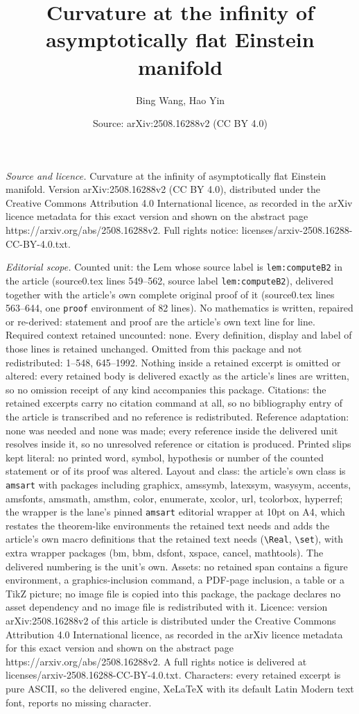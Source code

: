 \documentclass[10pt,a4paper]{amsart}
\title[Curvature at the infinity of asymptotically flat Einstein ma]{Curvature at the infinity of asymptotically flat Einstein manifold}
\author{Bing Wang, Hao Yin}
\date{Source: arXiv:2508.16288v2 (CC BY 4.0)}
\begin{document}
\maketitle

\noindent\emph{Source and licence.} Curvature at the infinity of asymptotically flat Einstein manifold. Version arXiv:2508.16288v2 (CC BY 4.0), distributed under the Creative Commons Attribution 4.0 International licence, as recorded in the arXiv licence metadata for this exact version and shown on the abstract page https://arxiv.org/abs/2508.16288v2. Full rights notice: licenses/arxiv-2508.16288-CC-BY-4.0.txt.\par\smallskip

\noindent\textit{Editorial scope.} Counted unit: the Lem whose source label is \texttt{lem:computeB2} in the article (source0.tex lines 549--562, source label \texttt{lem:computeB2}), delivered together with the article's own complete original proof of it (source0.tex lines 563--644, one \texttt{proof} environment of 82 lines). No mathematics is written, repaired or re-derived: statement and proof are the article's own text line for line. Required context retained uncounted: none. Every definition, display and label of those lines is retained unchanged. Omitted from this package and not redistributed: 1--548, 645--1992. Nothing inside a retained excerpt is omitted or altered: every retained body is delivered exactly as the article's lines are written, so no omission receipt of any kind accompanies this package. Citations: the retained excerpts carry no citation command at all, so no bibliography entry of the article is transcribed and no reference is redistributed. Reference adaptation: none was needed and none was made; every reference inside the delivered unit resolves inside it, so no unresolved reference or citation is produced. Printed slips kept literal: no printed word, symbol, hypothesis or number of the counted statement or of its proof was altered. Layout and class: the article's own class is \texttt{amsart} with packages including graphicx, amssymb, latexsym, wasysym, accents, amsfonts, amsmath, amsthm, color, enumerate, xcolor, url, tcolorbox, hyperref; the wrapper is the lane's pinned \texttt{amsart} editorial wrapper at 10pt on A4, which restates the theorem-like environments the retained text needs and adds the article's own macro definitions that the retained text needs (\texttt{\textbackslash Real}, \texttt{\textbackslash set}), with extra wrapper packages (bm, bbm, dsfont, xspace, cancel, mathtools). The delivered numbering is the unit's own. Assets: no retained span contains a figure environment, a graphics-inclusion command, a PDF-page inclusion, a table or a TikZ picture; no image file is copied into this package, the package declares no asset dependency and no image file is redistributed with it. Licence: version arXiv:2508.16288v2 of this article is distributed under the Creative Commons Attribution 4.0 International licence, as recorded in the arXiv licence metadata for this exact version and shown on the abstract page https://arxiv.org/abs/2508.16288v2. A full rights notice is delivered at licenses/arxiv-2508.16288-CC-BY-4.0.txt. Characters: every retained excerpt is pure ASCII, so the delivered engine, XeLaTeX with its default Latin Modern text font, reports no missing character.
\end{document}
